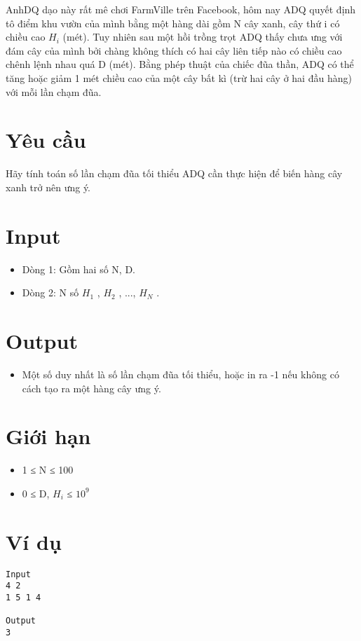 



   AnhDQ dạo này rất mê chơi FarmVille trên Facebook, hôm nay ADQ quyết định tô điểm khu vườn của mình bằng một hàng dài gồm N cây xanh, cây thứ i có chiều cao $H_{i}$   (mét). Tuy nhiên sau một hồi trồng trọt ADQ thấy chưa ưng với đám cây của mình bởi chàng không thích có hai cây liên tiếp nào có chiều cao chênh lệnh nhau quá D (mét). Bằng phép thuật của chiếc đũa thần, ADQ có thể tăng hoặc giảm 1 mét chiều cao của một cây bất kì (trừ hai cây ở hai đầu hàng) với mỗi lần chạm đũa.  

\section{   Yêu cầu  }

   Hãy tính toán số lần chạm đũa tối thiểu ADQ cần thực hiện để biến hàng cây xanh trở nên ưng ý.  

\section{   Input  }
\begin{itemize}
	\item     Dòng 1: Gồm hai số N, D.   
	\item     Dòng 2: N số $H_{1}$    , $H_{2}$    , ..., $H_{N}$    .   
\end{itemize}

\section{   Output  }
\begin{itemize}
	\item     Một số duy nhất là số lần chạm đũa tối thiểu, hoặc in ra -1 nếu không có cách tạo ra một hàng cây ưng ý.   
\end{itemize}

\section{   Giới hạn  }
\begin{itemize}
	\item     1 ≤ N ≤ 100   
	\item     0 ≤ D, $H_{i}$    ≤ $10^{9}$
\end{itemize}

\section{   Ví dụ  }
\begin{verbatim}
Input
4 2
1 5 1 4

Output
3
\end{verbatim}
